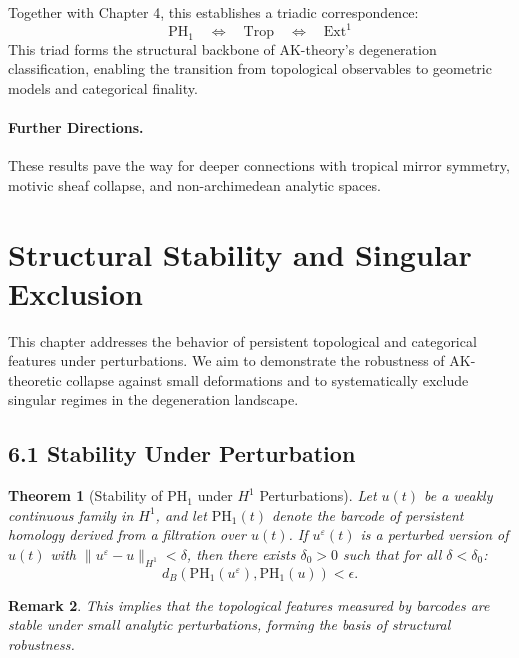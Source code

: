 \documentclass[11pt]{article}
\newtheorem{theorem}{Theorem}[section]
\newtheorem{remark}[theorem]{Remark}
\begin{document}
Together with Chapter 4, this establishes a triadic correspondence:
\[
\mathrm{PH}_1 \quad \Longleftrightarrow \quad \mathrm{Trop} \quad \Longleftrightarrow \quad \mathrm{Ext}^1
\]
This triad forms the structural backbone of AK-theory’s degeneration classification, enabling the transition from topological observables to geometric models and categorical finality.

\paragraph{Further Directions.}
These results pave the way for deeper connections with tropical mirror symmetry, motivic sheaf collapse, and non-archimedean analytic spaces.



\section{Structural Stability and Singular Exclusion}

This chapter addresses the behavior of persistent topological and categorical features under perturbations. We aim to demonstrate the robustness of AK-theoretic collapse against small deformations and to systematically exclude singular regimes in the degeneration landscape.

\subsection{6.1 Stability Under Perturbation}

\begin{theorem}[Stability of PH$_1$ under $H^1$ Perturbations]
Let $u(t)$ be a weakly continuous family in $H^1$, and let $\mathrm{PH}_1(t)$ denote the barcode of persistent homology derived from a filtration over $u(t)$. If $u^\varepsilon(t)$ is a perturbed version of $u(t)$ with $\|u^\varepsilon - u\|_{H^1} < \delta$, then there exists $\delta_0 > 0$ such that for all $\delta < \delta_0$:
\[
d_B(\mathrm{PH}_1(u^\varepsilon), \mathrm{PH}_1(u)) < \epsilon.
\]
\end{theorem}

\begin{remark}
This implies that the topological features measured by barcodes are stable under small analytic perturbations, forming the basis of structural robustness.
\end{remark}
\end{document}

